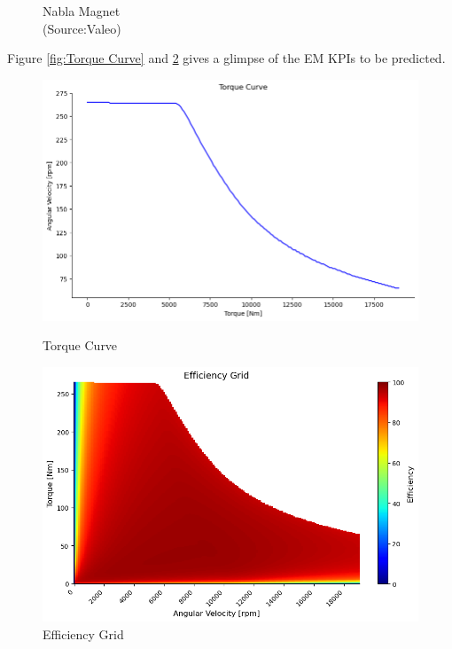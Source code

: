 \documentclass{report} %
\begin{document}
\begin{figure}[H]
\begin{minipage}[b]{0.325\textwidth}
        \caption{\centering Nabla Magnet\\ (Source:Valeo)}
        \label{fig:Nabla Magnet}
    \end{minipage}
\end{figure}

Figure \ref{fig:Torque Curve} and \ref{fig:Efficiency Grid} gives a glimpse of the \ac{EM} \ac{KPI}s to be predicted. \\
\begin{figure}[H]
    \centering
    \begin{minipage}[b]{0.475\textwidth}
        \centering
        \includegraphics[width=\textwidth]{./ReportImages/TorqueCurve.png}
        \caption{Torque Curve} %
        \label{fig:Torque Curve}
    \end{minipage}
    \hfill
    \begin{minipage}[b]{0.475\textwidth}
        \centering
        \includegraphics[width=\textwidth]{./ReportImages/EfficiencyGrid.png}
        \caption{Efficiency Grid}
        \label{fig:Efficiency Grid}
    \end{minipage}
\end{figure}
\end{document}
